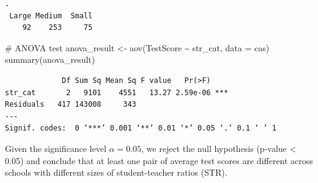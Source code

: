 \documentclass[
  12pt,
  letterpaper,
]{scrbook}
\newenvironment{Shaded}{\begin{snugshade}}{\end{snugshade}}
\newcommand{\AttributeTok}[1]{\textcolor[rgb]{0.40,0.45,0.13}{#1}}
\newcommand{\CommentTok}[1]{\textcolor[rgb]{0.37,0.37,0.37}{#1}}
\newcommand{\DecValTok}[1]{\textcolor[rgb]{0.68,0.00,0.00}{#1}}
\newcommand{\FunctionTok}[1]{\textcolor[rgb]{0.28,0.35,0.67}{#1}}
\newcommand{\NormalTok}[1]{\textcolor[rgb]{0.00,0.23,0.31}{#1}}
\newcommand{\OtherTok}[1]{\textcolor[rgb]{0.00,0.23,0.31}{#1}}
\newcommand{\SpecialCharTok}[1]{\textcolor[rgb]{0.37,0.37,0.37}{#1}}
\newcommand{\StringTok}[1]{\textcolor[rgb]{0.13,0.47,0.30}{#1}}
\theoremstyle{definition}
\theoremstyle{plain}
\theoremstyle{remark}
\begin{document}
\begin{Shaded}
\end{Shaded}

\begin{verbatim}
.
 Large Medium  Small 
    92    253     75 
\end{verbatim}

\begin{Shaded}
\begin{Highlighting}[]
\CommentTok{\# ANOVA test}
\NormalTok{anova\_result }\OtherTok{\textless{}{-}} \FunctionTok{aov}\NormalTok{(TestScore }\SpecialCharTok{\textasciitilde{}}\NormalTok{ str\_cat, }\AttributeTok{data =}\NormalTok{ cas)}
\FunctionTok{summary}\NormalTok{(anova\_result)}
\end{Highlighting}
\end{Shaded}

\begin{verbatim}
             Df Sum Sq Mean Sq F value   Pr(>F)    
str_cat       2   9101    4551   13.27 2.59e-06 ***
Residuals   417 143008     343                     
---
Signif. codes:  0 ‘***’ 0.001 ‘**’ 0.01 ‘*’ 0.05 ‘.’ 0.1 ‘ ’ 1
\end{verbatim}

Given the significance level \(\alpha = 0.05\), we reject the null
hypothesis (p-value \textless{} 0.05) and conclude that at least one
pair of average test scores are different across schools with different
sizes of student-teacher ratios (STR).
\end{document}
